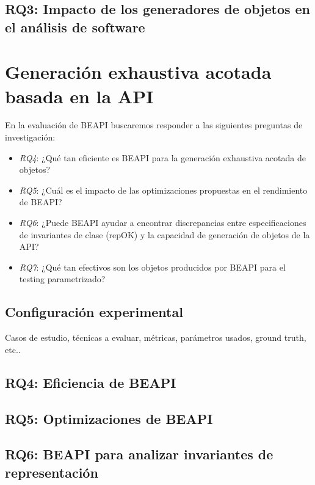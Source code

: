 \subsection{RQ3: Impacto de los generadores de objetos en el análisis de
software}

\section{Generación exhaustiva acotada basada en la API}
\label{sec:experimentalBeapi}

En la evaluación de BEAPI buscaremos responder a las siguientes preguntas de
investigación:

\begin{itemize}
\item \emph{RQ4}: ¿Qué tan eficiente es BEAPI para la generación exhaustiva                                                                                       
    acotada de objetos?
\item\emph{RQ5}: ¿Cuál es el impacto de las optimizaciones propuestas en el
    rendimiento de BEAPI?
\item\emph{RQ6}: ¿Puede BEAPI ayudar a encontrar discrepancias entre
    especificaciones de invariantes de clase (repOK) y la capacidad de generación de objetos de la API?
\item\emph{RQ7}: ¿Qué tan efectivos son los objetos producidos por BEAPI para el
    testing parametrizado?  
\end{itemize}

\subsection{Configuración experimental}

Casos de estudio, técnicas a evaluar, métricas, parámetros usados, ground truth, etc..



\subsection{RQ4: Eficiencia de BEAPI}



\subsection{RQ5: Optimizaciones de BEAPI}



\subsection{RQ6: BEAPI para analizar invariantes de representación}



